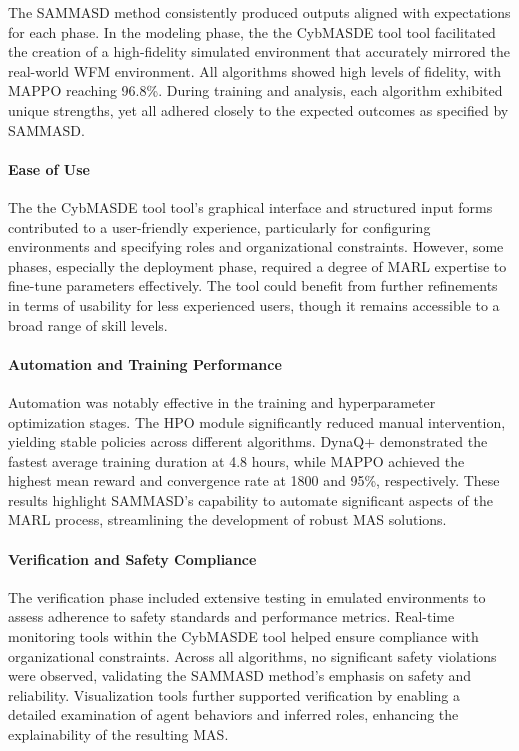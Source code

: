 \documentclass[sigconf,anonymous]{aamas}
\begin{document}
The SAMMASD method consistently produced outputs aligned with expectations for each phase. In the modeling phase, the the CybMASDE tool tool facilitated the creation of a high-fidelity simulated environment that accurately mirrored the real-world WFM environment. All algorithms showed high levels of fidelity, with MAPPO reaching 96.8\%. During training and analysis, each algorithm exhibited unique strengths, yet all adhered closely to the expected outcomes as specified by SAMMASD.

\paragraph{Ease of Use}

The the CybMASDE tool tool's graphical interface and structured input forms contributed to a user-friendly experience, particularly for configuring environments and specifying roles and organizational constraints. However, some phases, especially the deployment phase, required a degree of MARL expertise to fine-tune parameters effectively. The tool could benefit from further refinements in terms of usability for less experienced users, though it remains accessible to a broad range of skill levels.

\paragraph{Automation and Training Performance}

Automation was notably effective in the training and hyperparameter optimization stages. The HPO module significantly reduced manual intervention, yielding stable policies across different algorithms. DynaQ+ demonstrated the fastest average training duration at 4.8 hours, while MAPPO achieved the highest mean reward and convergence rate at 1800 and 95\%, respectively. These results highlight SAMMASD's capability to automate significant aspects of the MARL process, streamlining the development of robust MAS solutions.

\paragraph{Verification and Safety Compliance}

The verification phase included extensive testing in emulated environments to assess adherence to safety standards and performance metrics. Real-time monitoring tools within the CybMASDE tool helped ensure compliance with organizational constraints. Across all algorithms, no significant safety violations were observed, validating the SAMMASD method's emphasis on safety and reliability. Visualization tools further supported verification by enabling a detailed examination of agent behaviors and inferred roles, enhancing the explainability of the resulting MAS.
\end{document}
